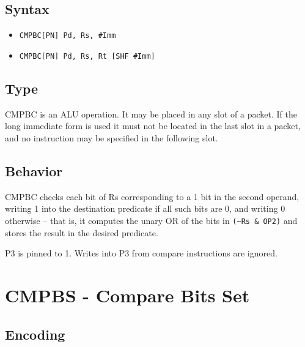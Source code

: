 \documentclass[11pt,openany]{report}
\begin{document}
\subsection{Syntax}

\begin{itemize}
  \item \verb!CMPBC[PN] Pd, Rs, #Imm!
  \item \verb!CMPBC[PN] Pd, Rs, Rt [SHF #Imm]!
\end{itemize}

\subsection{Type}
CMPBC is an ALU operation. It may be placed in any slot of a packet. If the long immediate form is used it must not be located in the last slot in a packet, and no instruction may be specified in the following slot.

\subsection{Behavior}
CMPBC checks each bit of Rs corresponding to a 1 bit in the second operand, writing 1 into the destination predicate if all such bits are 0, and writing 0 otherwise -- that is, it computes the unary OR of the bits in \verb!(~Rs & OP2)! and stores the result in the desired predicate.

\noindent
P3 is pinned to 1. Writes into P3 from compare instructions are ignored.

\pagebreak
\section{CMPBS - Compare Bits Set}

\subsection{Encoding}
\end{document}
